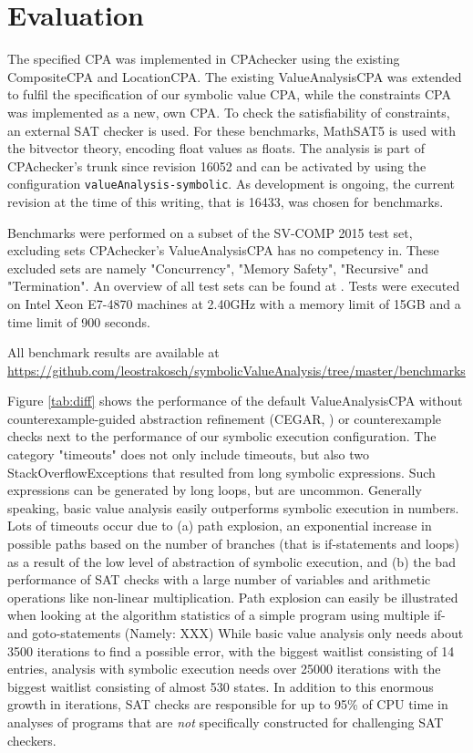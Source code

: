\section{Evaluation}
The specified CPA was implemented in CPAchecker\cite{Beyer2011} using the existing CompositeCPA and LocationCPA.
The existing ValueAnalysisCPA  was extended to fulfil the specification of our symbolic value CPA,
while the constraints CPA was implemented as a new, own CPA. To check the satisfiability of constraints, an external SAT checker is used. For these benchmarks, MathSAT5 is used with the bitvector theory, encoding float values as floats.
The analysis is part of CPAchecker's trunk since revision 16052 and can be activated by using the configuration \texttt{valueAnalysis-symbolic}. As development is ongoing, the current revision at the time of this writing, that is 16433, was chosen for benchmarks.

Benchmarks were performed on a subset of the SV-COMP 2015 test set, excluding sets CPAchecker's ValueAnalysisCPA has no competency in.
These excluded sets are namely "Concurrency", "Memory Safety", "Recursive" and "Termination". An overview of all test sets can be found at \cite{SV15Benchmark}.
Tests were executed on Intel Xeon E7-4870 machines at 2.40GHz with a memory limit of 15GB and a time limit of 900 seconds.

All benchmark results are available at \url{https://github.com/leostrakosch/symbolicValueAnalysis/tree/master/benchmarks}

Figure \ref{tab:diff} shows the performance of the default ValueAnalysisCPA without counterexample-guided abstraction refinement (CEGAR, \cite{XXX}) or counterexample checks next to the performance of our symbolic execution configuration. The category "timeouts" does not only include timeouts, but also two StackOverflowExceptions that resulted from long symbolic expressions. Such expressions can be generated by long loops, but are uncommon.
Generally speaking, basic value analysis easily outperforms symbolic execution in numbers.
Lots of timeouts occur due to
(a) path explosion, an exponential increase in possible paths based on the number of branches (that is if-statements and loops) as a result of the low level of abstraction of symbolic execution, and
(b) the bad performance of SAT checks with a large number of variables and arithmetic operations like non-linear multiplication.
Path explosion can easily be illustrated when looking at the algorithm statistics of a simple program using multiple if- and goto-statements (Namely: XXX)
While basic value analysis only needs about 3500 iterations to find a possible error, with the biggest waitlist consisting of 14 entries,
analysis with symbolic execution needs over 25000 iterations with the biggest waitlist consisting of almost 530 states.
In addition to this enormous growth in iterations, SAT checks are responsible for up to 95\% of CPU time in analyses of programs that are \emph{not} specifically constructed for challenging SAT checkers.

